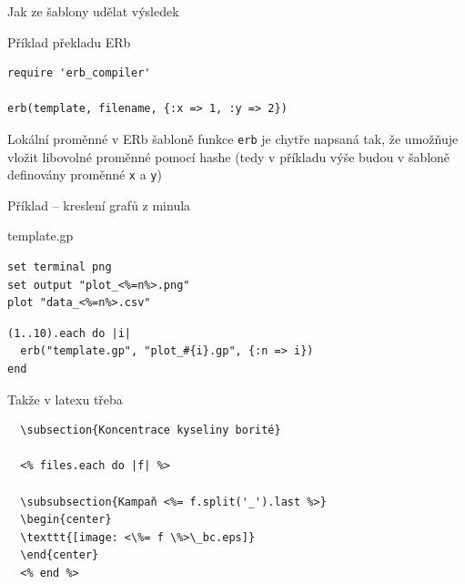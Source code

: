 \documentclass{beamer}
\begin{document}
\begin{frame}[fragile]{Jak ze šablony udělat výsledek}
  \scriptsize
  \begin{block}{Příklad překladu ERb}
    \scriptsize
    \begin{verbatim}
require 'erb_compiler'

erb(template, filename, {:x => 1, :y => 2})
    \end{verbatim}
  \end{block}
  \begin{block}{Lokální proměnné v ERb šabloně}
    \scriptsize
    funkce \texttt{erb} je chytře napsaná tak, že umožňuje vložit libovolné proměnné pomocí hashe (tedy v příkladu výše budou v šabloně definovány proměnné \texttt{x} a \texttt{y})
  \end{block}
\end{frame}

\begin{frame}[fragile]{Příklad -- kreslení grafů z minula}
  \begin{block}{template.gp}
    \scriptsize
    \begin{verbatim}
set terminal png
set output "plot_<%=n%>.png"
plot "data_<%=n%>.csv"
    \end{verbatim}
  \end{block}
  \begin{block}{}
    \scriptsize
    \begin{verbatim}
(1..10).each do |i|
  erb("template.gp", "plot_#{i}.gp", {:n => i})
end
    \end{verbatim}
  \end{block}
\end{frame}

\begin{frame}[fragile]{Takže v latexu třeba}
\scriptsize
\begin{verbatim}
  \subsection{Koncentrace kyseliny borité}

  <% files.each do |f| %>

  \subsubsection{Kampaň <%= f.split('_').last %>}
  \begin{center}
  \texttt{[image: <\%= f \%>\_bc.eps]}
  \end{center}
  <% end %>
\end{verbatim}
\end{frame}
\end{document}
